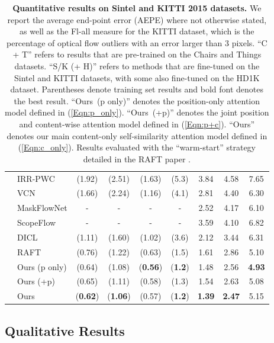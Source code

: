 \documentclass[10pt,twocolumn,letterpaper]{article}
\begin{document}
\begin{table*}[t!]
\begin{tabularx}{\textwidth}{@{}l l C C C C C C c@{}}
                     & IRR-PWC \cite{irr}     & (1.92) & (2.51) & (1.63) & (5.3) & 3.84  & 4.58  & 7.65 \\
                     & VCN \cite{vcn}            & (1.66)     & (2.24) & (1.16) & (4.1) & 2.81  & 4.40 & 6.30 \\
                     & MaskFlowNet\cite{maskflownet} & - & - & - & - & 2.52 & 4.17 & 6.10 \\
                     & ScopeFlow\cite{scopeflow} & - & - & - & - & 3.59 & 4.10 & 6.82 \\
                     & DICL\cite{dicl}  & (1.11) & (1.60) & (1.02) & (3.6) & 2.12 & 3.44  & 6.31 \\
                     & RAFT\cite{raft}  & (0.76) & (1.22) & (0.63) & (1.5) & 1.61 & 2.86  & 5.10 \\
                     \cmidrule[\lightrulewidth](r{0.3em}){2-9}
                     & Ours (p only)  & (0.64) & (1.08) & (\textbf{0.56}) & (\textbf{1.2}) & 1.48 & 2.56 & \textbf{4.93} \\
                     & Ours (+p)  & (0.65) & (1.11) & (0.58) & (1.3) & 1.54 & 2.63 & 5.08 \\
                     & Ours  & (\textbf{0.62}) & (\textbf{1.06}) & (0.57) & (\textbf{1.2}) & \textbf{1.39} & \textbf{2.47} & 5.15 \\
\bottomrule
\end{tabularx}
\vspace{0pt} \caption{\textbf{Quantitative results on Sintel and KITTI 2015 datasets.} We report the average end-point error (AEPE) where not otherwise stated, as well as the Fl-all measure for the KITTI dataset, which is the percentage of optical flow outliers with an error larger than 3 pixels. ``C + T'' refers to results that are pre-trained on the Chairs and Things datasets. ``S/K (+ H)'' refers to methods that are fine-tuned on the Sintel and KITTI datasets, with some also fine-tuned on the HD1K dataset. Parentheses denote training set results and bold font denotes the best result. ``Ours~(p only)'' denotes the position-only attention model defined in (\ref{Eqn:p_only}). ``Ours~(+p)'' denotes the joint position and content-wise attention model defined in (\ref{Eqn:p+c}). ``Ours'' denotes our main content-only self-similarity attention model defined in (\ref{Eqn:c_only}). Results evaluated with the ``warm-start'' strategy detailed in the RAFT paper \cite{raft}.
}
\label{Tab:Results}
\end{table*} 
\subsection{Qualitative Results}
\label{Sec:qualitative}
\end{document}
